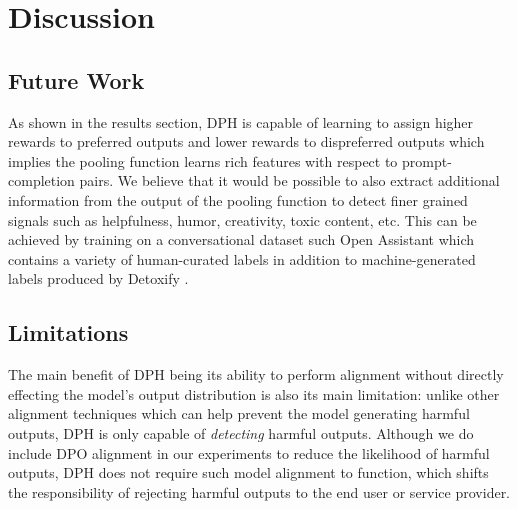 \section{Discussion}

\subsection{Future Work}
As shown in the results section, DPH is capable of learning to assign higher rewards to preferred outputs and lower rewards to dispreferred outputs which implies the pooling function learns rich features with respect to prompt-completion pairs. We believe that it would be possible to also extract additional information from the output of the pooling function to detect finer grained signals such as helpfulness, humor, creativity, toxic content, etc. This can be achieved by training on a conversational dataset such Open Assistant \cite{köpf2023openassistant} which contains a variety of human-curated labels in addition to machine-generated labels produced by Detoxify \cite{Detoxify}.


\subsection{Limitations}
The main benefit of DPH being its ability to perform alignment without directly effecting the model's output distribution is also its main limitation: unlike other alignment techniques which can help prevent the model generating harmful outputs, DPH is only capable of \textit{detecting} harmful outputs. Although we do include DPO alignment in our experiments to reduce the likelihood of harmful outputs, DPH does not require such model alignment to function, which shifts the responsibility of rejecting harmful outputs to the end user or service provider.


